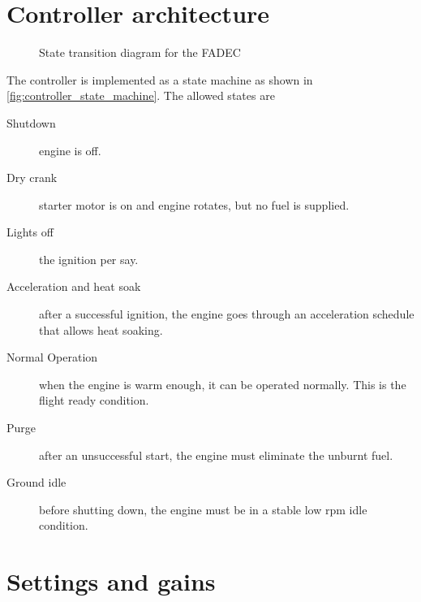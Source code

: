 \section{Controller architecture}
\begin{figure}[tp]
    \centering
    \caption{State transition diagram for the \acs{FADEC}}
    
    
    \source{\authorsfigure}
    \label{fig:controller_state_machine}
\end{figure}
The controller is implemented as a state machine \cite{amd_state_machine} 
 as shown in \autoref{fig:controller_state_machine}. 
The allowed states are
\begin{description}
    \item[Shutdown] engine is off. 
    \item[Dry crank] starter motor is on and engine rotates,
          but no fuel is supplied.
    \item[Lights off] the ignition per say. 
    \item[Acceleration and heat soak] after a successful ignition,
          the engine goes through an acceleration schedule that allows heat soaking. 
    \item[Normal Operation] when the engine is warm enough, it can be operated normally.
          This is the flight ready condition.
    \item[Purge] after an unsuccessful start, the engine must eliminate the unburnt fuel. 
    \item[Ground idle] before shutting down, the engine must be in a stable low rpm idle condition.
\end{description}


\section{Settings and gains}

